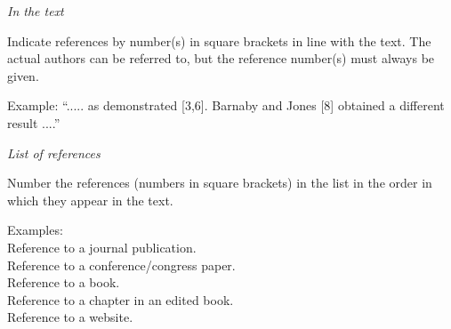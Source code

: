 \documentclass[twocolumn, 10pt]{article}
\begin{document}
\noindent\textit{In the text}

Indicate references by number(s) in square brackets in line with the text. The actual authors can be referred to, but the reference number(s) must always be given.

Example: “..... as demonstrated [3,6]. Barnaby and Jones [8] obtained a different result ....”

\noindent\textit{List of references}

Number the references (numbers in square brackets) in the list in the order in which they appear in the text.

Examples:\\
Reference to a journal publication\cite{art}.\\
Reference to a conference/congress paper\cite{conf}.\\
Reference to a book\cite{book}.\\
Reference to a chapter in an edited book\cite{chap}.\\
Reference to a website\cite{web}.




\end{document}
